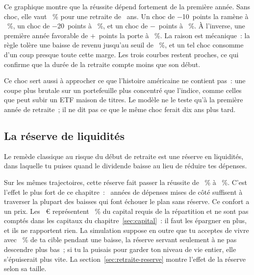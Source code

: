 Ce graphique montre que la r\'eussite d\'epend fortement de la premi\`ere ann\'ee. Sans choc, elle vaut
\ErfolgsquoteBasis~\% pour une retraite de \McRenteAns~ans. Un choc de $-$10~points la ram\`ene \`a
\McErfolgChocMoinsDix~\%, un choc de $-$20~points \`a \McErfolgChocMoinsVingt~\%, et un choc de
$-$\ChocGrilleMax~points \`a \McErfolgChocMin~\%. \`A l'inverse, une premi\`ere ann\'ee favorable de
$+$\ChocGrilleMax~points la porte \`a \McErfolgChocMax~\%.  La raison est m\'ecanique~: la r\`egle tol\`ere une baisse de revenu jusqu'au seuil de
\SeuilReussite~\%, et un tel choc consomme d'un coup presque toute cette marge. Les trois courbes
restent proches, ce qui confirme que la dur\'ee de la retraite compte moins que son d\'ebut.

Ce choc sert aussi \`a approcher ce que l'histoire am\'ericaine ne contient pas~: une coupe plus
brutale sur un portefeuille plus concentr\'e que l'indice, comme celles que peut subir un ETF maison de
\NombreTitres{} titres. Le mod\`ele ne le teste qu'\`a la premi\`ere ann\'ee de retraite~; il ne dit
pas ce que le m\^eme choc ferait dix ans plus tard.

\subsection{La r\'eserve de liquidit\'es}\label{sec:risques-reserve}

Le rem\`ede classique au risque du d\'ebut de retraite est une r\'eserve en liquidit\'es, dans laquelle
tu puises quand le dividende baisse au lieu de r\'eduire tes d\'epenses.


Sur les m\^emes trajectoires, cette r\'eserve fait passer la r\'eussite de \ErfolgsquoteBasis~\% \`a
\ErfolgsquoteMitPuffer~\%. C'est l'effet le plus fort de ce chapitre~: \PufferJahreMit~ann\'ees de
d\'epenses mises de c\^ot\'e suffisent \`a traverser la plupart des baisses qui font \'echouer le plan
sans r\'eserve. Ce confort a un prix. Les \PufferMontantMit~€ repr\'esentent
\PufferPartCapitalProzent~\% du capital requis de la r\'epartition \ReferenzStrategie{} et ne sont pas
compt\'es dans les capitaux du chapitre~\ref{sec:capital}~: il faut les \'epargner en plus, et ils ne
rapportent rien. La simulation suppose en outre que tu acceptes de vivre avec \SeuilReussite~\% de ta
cible pendant une baisse, la r\'eserve servant seulement \`a ne pas descendre plus bas~; si tu la
puisais pour garder ton niveau de vie entier, elle s'\'epuiserait plus vite. La
section~\ref{sec:retraite-reserve} montre l'effet de la r\'eserve selon sa taille.

